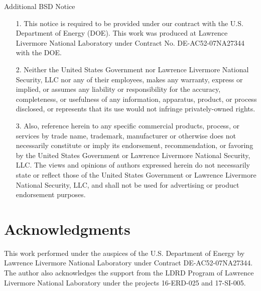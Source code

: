 \documentclass[11pt]{article}
\begin{document}
\begin{center}
{\begin{minipage}{0.9\textwidth}
\medskip

Additional BSD Notice
\begin{itemize}
\item[1.] This notice is required to be provided under our contract with the U.S. Department 
of Energy (DOE). This work was produced at Lawrence Livermore National Laboratory under 
Contract No. DE-AC52-07NA27344 with the DOE.
\item[2.] Neither the United States Government nor Lawrence Livermore National Security, LLC 
nor any of their employees, makes any warranty, express or implied, or assumes any 
liability or responsibility for the accuracy, completeness, or usefulness of any 
information, apparatus, product, or process disclosed, or represents that its use would
not infringe privately-owned rights.
\item[3.] Also, reference herein to any specific commercial products, process, or services by 
trade name, trademark, manufacturer or otherwise does not necessarily constitute or 
imply its endorsement, recommendation, or favoring by the United States Government or 
Lawrence Livermore National Security, LLC. The views and opinions of authors expressed 
herein do not necessarily state or reflect those of the United States Government or 
Lawrence Livermore National Security, LLC, and shall not be used for advertising or 
product endorsement purposes.
\end{itemize}
\end{minipage}}\end{center}

\section{Acknowledgments}
This work performed under the auspices of the U.S. Department of Energy by Lawrence Livermore National Laboratory under Contract DE-AC52-07NA27344. The author also acknowledges the support from the LDRD Program of Lawrence Livermore National Laboratory under the projects 16-ERD-025 and 17-SI-005.












\end{document}

